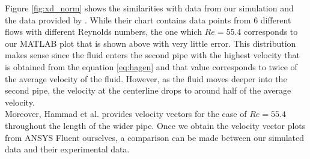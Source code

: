\noindent Figure \ref{fig:xd_norm} shows the similarities with data from our simulation and the data provided by \cite{hammad_ötügen_arik_1999}. While their chart contains data points from 6 different flows with different Reynolds numbers, the one which $Re = 55.4$ corresponds to our MATLAB plot that is shown above with very little error. This distribution makes sense since the fluid enters the second pipe with the highest velocity that is obtained from the equation \ref{eq:hagen} and that value corresponds to twice of the average velocity of the fluid. However, as the fluid moves deeper into the second pipe, the velocity at the centerline drops to around half of the average velocity.\\


\noindent Moreover, Hammad et al. provides velocity vectors for the case of $Re = 55.4$ throughout the length of the wider pipe. Once we obtain the velocity vector plots from ANSYS Fluent ourselves, a comparison can be made between our simulated data and their experimental data. 

